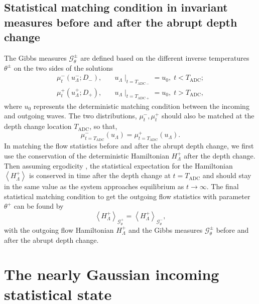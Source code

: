 \documentclass[9pt,twocolumn,twoside,lineno]{pnas-new}
\begin{document}
\subsection{Statistical matching condition in invariant measures before and after the abrupt depth change}

The Gibbs measures $\mathcal{G}_{\theta}^{\pm}$ are defined based
on the different inverse temperatures $\theta^{\pm}$ on the two sides
of the solutions
\[
\begin{aligned}\mu_{t}^{-}\left(u_{\Lambda}^{-};D_{-}\right), & \quad u_{\Lambda}\mid_{t=T_{\mathrm{ADC}-}}=u_{0},\;t<T_{\mathrm{ADC}};\\
\mu_{t}^{+}\left(u_{\Lambda}^{+};D_{+}\right), & \quad u_{\Lambda}\mid_{t=T_{\mathrm{ADC}+}}=u_{0},\;t>T_{\mathrm{ADC}},
\end{aligned}
\]
where $u_{0}$ represents the deterministic matching condition between
the incoming and outgoing waves. The two distributions, $\mu_{t}^{-},\mu_{t}^{+}$
should also be matched at the depth change location $T_{\mathrm{ADC}}$,
so that,
\[
\mu_{t=T_{\mathrm{ADC}}}^{-}\left(u_{\Lambda}\right)=\mu_{t=T_{\mathrm{ADC}}}^{+}\left(u_{\Lambda}\right).
\]
In matching the flow statistics before and after the abrupt depth
change, we first use the conservation of the deterministic Hamiltonian
$H_{\Lambda}^{+}$ after the depth change. Then assuming ergodicity
\cite{abramov2003hamiltonian,majda2006nonlinear}, the statistical
expectation for the Hamiltonian $\left\langle H_{\Lambda}^{+}\right\rangle $
is conserved in time after the depth change at $t=T_{\mathrm{ADC}}$
and should stay in the same value as the system approaches equilibrium
as $t\rightarrow\infty$. The final statistical matching condition
to get the outgoing flow statistics with parameter $\theta^{+}$ can
be found by
\begin{equation}
\left\langle H_{\Lambda}^{+}\right\rangle _{\mathcal{G}_{\theta}^{+}}=\left\langle H_{\Lambda}^{+}\right\rangle _{\mathcal{G}_{\theta}^{-}},\label{eq:matching}
\end{equation}
with the outgoing flow Hamiltonian $H_{\Lambda}^{+}$ and the Gibbs
measures $\mathcal{G}_{\theta}^{\pm}$ before and after the abrupt
depth change.

\section{The nearly Gaussian incoming statistical state}
\end{document}

